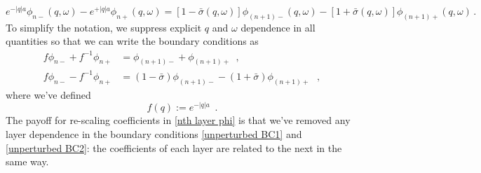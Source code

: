 \documentclass{article}
\newcommand{\lb}{\left[}
\newcommand{\rb}{\right]}
\begin{document}
\begin{equation}
    \label{superlattice discont init expression}
    e^{-|q|a} \phi_{n-}(q,\omega) - e^{+|q|a}\phi_{n+}(q,\omega) = 
   \lb1-\bar\sigma(q,\omega)\rb \phi_{(n+1)-}(q,\omega)-\lb1+\bar\sigma(q,\omega)\rb \phi_{(n+1)+}(q,\omega)
   \,.
\end{equation}
To simplify the notation, we suppress explicit $q$ and $\omega$ dependence in all quantities so that we can write the boundary conditions as
\begin{align}
    \label{unperturbed BC1}
    f \phi_{n-} + f^{-1}\phi_{n+} &= \phi_{(n+1)-} + \phi_{(n+1)+}
    \,\,\,,
    \\
    \label{unperturbed BC2}
    f \phi_{n-} - f^{-1}\phi_{n+} &= (1-\bar\sigma)\phi_{(n+1)-}-(1+\bar\sigma)\phi_{(n+1)+}
    \,\,\,\,,
\end{align}
where we've defined
\begin{equation}
    \label{f def}
    f(q):=e^{-|q|a}
    \,\,\,.
\end{equation}
The payoff for re-scaling coefficients in \eqref{nth layer phi} is that we've  removed any layer dependence in the boundary conditions \eqref{unperturbed BC1} and \eqref{unperturbed BC2}: the coefficients of each layer are related to the next in the same way.
\end{document}
